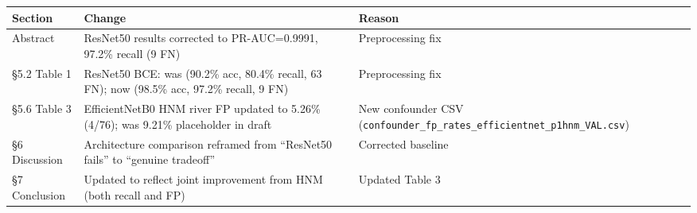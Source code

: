 \documentclass[
  11pt,
]{article}
\newcounter{none} %
\begin{document}
{\def\LTcaptype{none} %
\begin{longtable}[]{@{}
  >{\raggedright\arraybackslash}p{}
  >{\raggedright\arraybackslash}p{}
  >{\raggedright\arraybackslash}p{}@{}}
\toprule\noalign{}
\begin{minipage}[b]{\linewidth}\raggedright
Section
\end{minipage} & \begin{minipage}[b]{\linewidth}\raggedright
Change
\end{minipage} & \begin{minipage}[b]{\linewidth}\raggedright
Reason
\end{minipage} \\
\midrule\noalign{}
\endhead
\bottomrule\noalign{}
\endlastfoot
Abstract & ResNet50 results corrected to PR-AUC=0.9991, 97.2\% recall (9
FN) & Preprocessing fix \\
§5.2 Table 1 & ResNet50 BCE: was (90.2\% acc, 80.4\% recall, 63 FN); now
(98.5\% acc, 97.2\% recall, 9 FN) & Preprocessing fix \\
§5.6 Table 3 & EfficientNetB0 HNM river FP updated to 5.26\% (4/76); was
9.21\% placeholder in draft & New confounder CSV
(\texttt{confounder\_fp\_rates\_efficientnet\_p1hnm\_VAL.csv}) \\
§6 Discussion & Architecture comparison reframed from ``ResNet50 fails''
to ``genuine tradeoff'' & Corrected baseline \\
§7 Conclusion & Updated to reflect joint improvement from HNM (both
recall and FP) & Updated Table 3 \\
\end{longtable}
}
\end{document}
